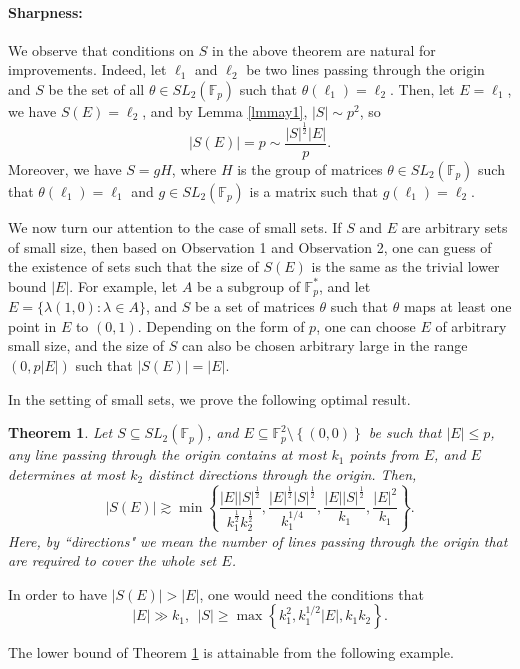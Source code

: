 \documentclass[11pt]{article}
\newtheorem{theorem}{Theorem}[section]
\def\Fbb{\mathbb{F}}
\def\SL{SL}
\def\l({\left(}
\def\r){\right)}
\def\lv{\left\vert}
\def\rv{\right\vert}
\def\lo{\left\{}
\def\ro{\right\}}
\begin{document}
\paragraph{Sharpness:} We observe that conditions on $S$ in the above theorem are natural for improvements. Indeed, let $\ell_1$  and $\ell_2$ be two lines passing through the origin and $S$ be the set of all $\theta \in \SL_2(\Fbb_p)$ such that $\theta (\ell_1) =\ell_2$. Then, let $E= \ell_1$, we have $S(E)=\ell_2$, and by Lemma \ref{lmmay1}, $|S|\sim p^2$, so
    \[ |S(E)| = p \sim \frac{|S|^{\frac{1}{2}}|E|}{p}. \]
    Moreover, we have $S=gH$, where $H$ is the group of matrices $\theta \in \SL_2(\Fbb_p)$ such that $\theta (\ell_1) =\ell_1$ and $g\in \SL_2(\Fbb_p)$ is a matrix such that $g(\ell_1) =\ell_2$. 
 
We now turn our attention to the case of small sets. If $S$ and $E$ are arbitrary sets of small size, then based on Observation 1 and Observation 2, one can guess of the existence of sets such that the size of $S(E)$ is the same as the trivial lower bound $|E|$. For example, let $A$ be a subgroup of $\mathbb{F}_p^*$, and let $E=\{\lambda (1, 0)\colon \lambda\in A\}$, and $S$ be a set of matrices 
$\theta$ such that $\theta$ maps at least one point in $E$ to $(0, 1)$. Depending on the form of $p$, one can choose $E$ of arbitrary small size, and the size of $S$ can also be chosen arbitrary large in the range $(0, p|E|)$ such that $|S(E)|=|E|$. 

In the setting of small sets, we prove the following optimal result. 
\begin{theorem}\label{thm345} 
  Let $S \subseteq \SL_2 \l( \Fbb_p \r)$, and $E \subseteq \Fbb_p^2\setminus \lo (0, 0)\ro$ be such that $|E| \le p$, any line passing through the origin contains at most $k_1$ points from $E$, and $E$ determines at most $k_2$ distinct directions through the origin. Then,
  \[ \lv S(E)\rv \gtrsim \min \lo  \frac{\lv E\rv \lv S\rv^{\frac{1}{2}}}{k_1^{\frac{1}{2}}k_2^{\frac{1}{2}}}, \frac{\lv E\rv^{\frac{1}{2}} \lv S\rv^{\frac{1}{2}}}{k_1^{1/4}}, \frac{\lv E\rv \lv S\rv^{\frac{1}{2}}}{k_1}, \frac{\lv E\rv^2}{k_1} \ro .\]
Here, by ``directions" we mean the number of lines passing through the origin that are required to cover the whole set $E$.
\end{theorem}
In order to have $|S(E)|> |E|$, one would need the conditions that 
\[|E|\gg k_1, ~~|S|\ge \max \left\lbrace k_1^2, k_1^{1/2}|E|, k_1k_2  \right\rbrace.\]


The lower bound of Theorem \ref{thm345} is attainable from the following example.
\end{document}
